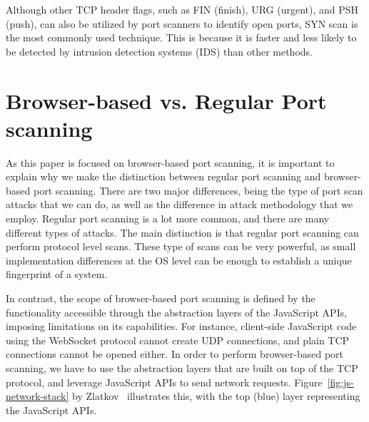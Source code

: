 Although other TCP header flags, such as FIN (finish), URG (urgent), and PSH (push), can also be utilized by port scanners to identify open ports, SYN scan is the most commonly used technique. This is because it is faster and less likely to be detected by intrusion detection systems (IDS) than other methods. 

\section{Browser-based vs. Regular Port scanning}

As this paper is focused on browser-based port scanning, it is important to explain why we make the distinction between regular port scanning and browser-based port scanning. 
There are two major differences, being the type of port scan attacks that we can do, as well as the difference in attack methodology that we employ. 
Regular port scanning is a lot more common, and there are many different types of attacks. 
The main distinction is that regular port scanning can perform protocol level scans. 
These type of scans can be very powerful, as small implementation differences at the OS level can be enough to establish a unique fingerprint of a system. 

In contrast, the scope of browser-based port scanning is defined by the functionality accessible through the abstraction layers of the JavaScript APIs, imposing limitations on its capabilities.
For instance, client-side JavaScript code using the WebSocket protocol cannot create UDP connections, and plain TCP connections cannot be opened either. 
In order to perform browser-based port scanning, we have to use the abstraction layers that are built on top of the TCP protocol, and leverage JavaScript APIs to send network requests. 
Figure~\ref{fig:js-network-stack} by Zlatkov~ illustrates this, with the top (blue) layer representing the JavaScript APIs.

